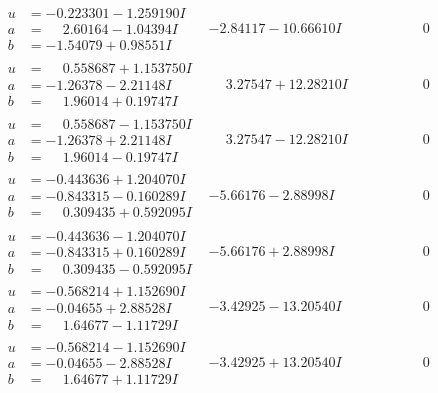 \documentclass[1p]{elsarticle_modified}
\theoremstyle{definition}
\begin{document}
$$\begin{array}{c|c|c}
\begin{aligned}
u &= -0.223301 - 1.259190 I \\
a &= \phantom{-}2.60164 - 1.04394 I \\
b &= -1.54079 + 0.98551 I\end{aligned}
 & -2.84117 - 10.66610 I & \phantom{-0.000000 } 0 \\ \hline\begin{aligned}
u &= \phantom{-}0.558687 + 1.153750 I \\
a &= -1.26378 - 2.21148 I \\
b &= \phantom{-}1.96014 + 0.19747 I\end{aligned}
 & \phantom{-}3.27547 + 12.28210 I & \phantom{-0.000000 } 0 \\ \hline\begin{aligned}
u &= \phantom{-}0.558687 - 1.153750 I \\
a &= -1.26378 + 2.21148 I \\
b &= \phantom{-}1.96014 - 0.19747 I\end{aligned}
 & \phantom{-}3.27547 - 12.28210 I & \phantom{-0.000000 } 0 \\ \hline\begin{aligned}
u &= -0.443636 + 1.204070 I \\
a &= -0.843315 - 0.160289 I \\
b &= \phantom{-}0.309435 + 0.592095 I\end{aligned}
 & -5.66176 - 2.88998 I & \phantom{-0.000000 } 0 \\ \hline\begin{aligned}
u &= -0.443636 - 1.204070 I \\
a &= -0.843315 + 0.160289 I \\
b &= \phantom{-}0.309435 - 0.592095 I\end{aligned}
 & -5.66176 + 2.88998 I & \phantom{-0.000000 } 0 \\ \hline\begin{aligned}
u &= -0.568214 + 1.152690 I \\
a &= -0.04655 + 2.88528 I \\
b &= \phantom{-}1.64677 - 1.11729 I\end{aligned}
 & -3.42925 - 13.20540 I & \phantom{-0.000000 } 0 \\ \hline\begin{aligned}
u &= -0.568214 - 1.152690 I \\
a &= -0.04655 - 2.88528 I \\
b &= \phantom{-}1.64677 + 1.11729 I\end{aligned}
 & -3.42925 + 13.20540 I & \phantom{-0.000000 } 0\\

\end{array}$$
\end{document}

